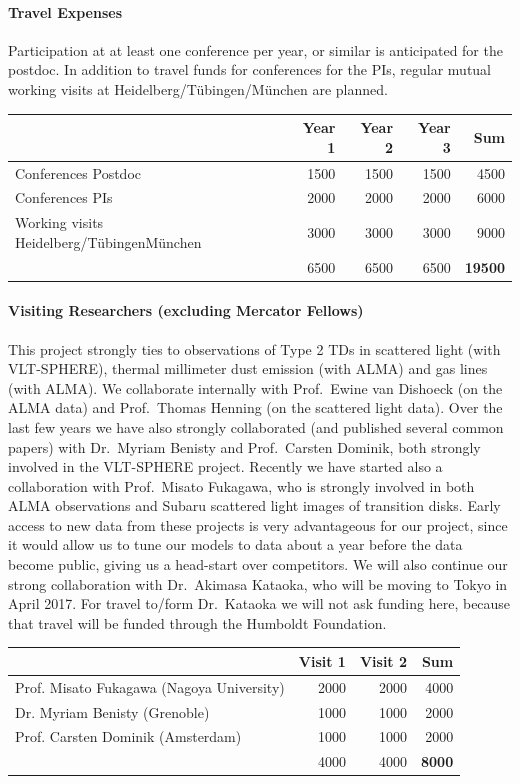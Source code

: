 \documentclass[10pt,fleqn,twoside]{article}
\begin{document}
\paragraph{Travel Expenses}
Participation at at least one conference per year, or similar is anticipated
for the postdoc. In addition to travel funds for conferences for the PIs,
regular mutual working visits at Heidelberg/T\"ubingen/M\"unchen are
planned.

\begin{center}
\begin{tabular}{l|r|r|r|r}
& Year 1 & Year 2 & Year 3 & Sum \\
\hline\hline
Conferences Postdoc                       	& 1500	& 1500 & 1500 & 4500\\
Conferences PIs                                 & 2000	& 2000 & 2000 & 6000\\
Working visits Heidelberg/T\"ubingenM\"unchen   & 3000	& 3000 & 3000 & 9000\\
\hline
  & 6500 & 6500 & 6500 & {\bf 19500}\\
\end{tabular}
\end{center}

\paragraph{Visiting Researchers (excluding Mercator Fellows)}
This project strongly ties to observations of Type 2 TDs in scattered light
(with VLT-SPHERE), thermal millimeter dust emission (with ALMA) and gas
lines (with ALMA). We collaborate internally with Prof.~Ewine van Dishoeck
(on the ALMA data) and Prof.~Thomas Henning (on the scattered light data).
Over the last few years we have also strongly collaborated (and published
several common papers) with Dr.~Myriam Benisty and Prof.~Carsten Dominik,
both strongly involved in the VLT-SPHERE project. Recently we have started
also a collaboration with Prof.~Misato Fukagawa, who is strongly involved in
both ALMA observations and Subaru scattered light images of transition
disks. Early access to new data from these projects is very advantageous for
our project, since it would allow us to tune our models to data about a year
before the data become public, giving us a head-start over competitors.  We
will also continue our strong collaboration with Dr.~Akimasa Kataoka, who
will be moving to Tokyo in April 2017. For travel to/form Dr.~Kataoka we
will not ask funding here, because that travel will be funded through the
Humboldt Foundation.
\begin{center}
\begin{tabular}{l|r|r|r}
& Visit 1 & Visit 2 & Sum \\
\hline\hline
Prof. Misato Fukagawa (Nagoya University)  & 2000 & 2000 & 4000 \\
Dr. Myriam Benisty (Grenoble)              & 1000 & 1000 & 2000 \\
Prof. Carsten Dominik (Amsterdam)          & 1000 & 1000 & 2000 \\
\hline
  & 4000 & 4000 & {\bf 8000}\\
\end{tabular}
\end{center}
\end{document}
